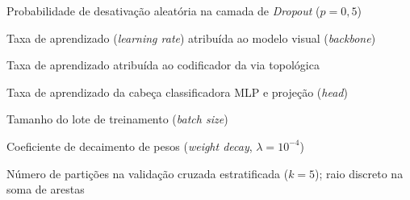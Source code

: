 \documentclass[
  12pt,		
  a4paper,	
  openright,  
  oneside,	
  chapter=TITLE,		
  section=TITLE,		
  english,	
  french,	    
  spanish,	
  brazil	    
]{abntex2}
\begin{document}
\begin{simbolos}
        \item[$p$] Probabilidade de desativação aleatória na camada de \textit{Dropout} ($p = 0{,}5$)
        \item[$\eta_{bb}$] Taxa de aprendizado (\textit{learning rate}) atribuída ao modelo visual (\textit{backbone})
        \item[$\eta_{\mathrm{top}}$] Taxa de aprendizado atribuída ao codificador da via topológica
        \item[$\eta_{hd}$] Taxa de aprendizado da cabeça classificadora MLP e projeção (\textit{head})
        \item[$B$] Tamanho do lote de treinamento (\textit{batch size})
        \item[$\lambda$] Coeficiente de decaimento de pesos (\textit{weight decay}, $\lambda = 10^{-4}$)
        \item[$k$] Número de partições na validação cruzada estratificada ($k = 5$); raio discreto na soma de arestas
    \end{simbolos}
    
    \tableofcontents*
    \newpage
    
    \textual
    \pagestyle{simple} 
    

    

    

    

    
    
    

   
    \postextual
    
    
\end{document}
